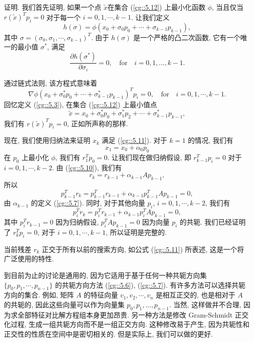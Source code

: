 \documentclass[a4paper]{ctexart}
\begin{document}
{证明. 我们首先证明, 如果一个点 $\tilde{x}$在集合 (\ref{cg::5.12}) 
上最小化函数 $\phi$, 当且仅当 $r(\tilde{x})^T p_i  = 0$ 
对于每一个 $i = 0, 1,\cdots, k - 1$. 
让我们定义 
$$
h(\sigma) =  \phi(x_0 + \sigma_0 p_0 + \cdots + \sigma_{k-1} p_{k-1}),
$$
其中 $\sigma = (\sigma_0, \sigma_1,\cdots,\sigma_{k - 1})^T$. 
由于 $h(\sigma)$ 是一个严格的凸二次函数, 它有一个唯一的最小值 $\sigma^*$, 
满足
\begin{equation*}
\frac{\partial h(\sigma^*)}{\partial \sigma_i} = 0, 
\quad \text{for} \quad i = 0, 1,..., k - 1.
\end{equation*}

通过链式法则, 该方程式意味着
\begin{equation*}
\nabla \phi(x_0 + \sigma_0^* p_0 + \cdots 
+ \sigma_{k-1}^* p_{k-1})^T p_i = 0, \quad \text{for} 
\quad i = 0, 1,\cdots, k - 1.
\end{equation*}
回忆定义 (\ref{cg::5.3}), 在集合 (\ref{cg::5.12}) 上最小值点 
$$
\tilde{x} = x_0 + \sigma_0^* p_0 + \sigma_1^* p_2 
+ \cdots + \sigma_{k-1}^* p_{k-1}, 
$$
我们有 $r(\tilde{x})^T p_i  = 0$, 正如所声称的那样.

现在, 我们使用归纳法来证明 $x_k$ 满足 (\ref{cg::5.11}). 
对于 $k = 1$ 的情况, 我们有
$$
x_1 = x_0 + \alpha_0 p_0
$$ 
在 $p_0$ 上最小化 $\phi$, 我们有 $r_1^T p_0 = 0$. 
让我们现在做归纳假设, 即 $r_{k - 1}^T p_i = 0$ 
对于 $i = 0, 1,\cdots, k - 2$. 
由 (\ref{cg::5.10}), 我们有
\begin{equation*}
r_k = r_{k - 1} + \alpha_{k - 1}A p_{k - 1},
\end{equation*}
所以
\begin{equation*}
p_{k-1}^T r_k = p_{k-1}^T r_{k-1} 
+ \alpha_{k-1} p_{k-1}^T A p_{k-1} = 0,
\end{equation*}
由 $\alpha_{k - 1}$ 的定义 (\ref{cg::5.7}). 
同时, 对于其他向量 $p_i$, $i = 0, 1, \cdots, k - 2$, 我们有
\begin{equation*}
p_i^T r_k = p_i^T r_{k - 1} + \alpha_{k - 1} p_i^T A p_{k - 1} = 0,
\end{equation*}
其中 $p_i^T r_{k - 1} = 0$ 因为归纳假设, $p_i^T A p_{k-1} = 0$ 
因为向量 $p_i$ 的共轭. 我们已经证明了 
$r_k^T p_i = 0$, 对于 $i = 0, 1,\cdots, k - 1$, 所以证明是完整的. 

当前残差 $r_k$ 正交于所有以前的搜索方向, 如公式 (\ref{cg::5.11}) 所表述, 
这是一个将广泛使用的特性. 

到目前为止的讨论是通用的, 因为它适用于基于任何一种共轭方向集 
$\{p_0, p_1,\cdots, p_{n - 1}\}$ 
的共轭方向方法 (\ref{cg::5.6}), (\ref{cg::5.7}). 
有许多方法可以选择共轭方向的集合. 例如, 矩阵 $A$ 的特征向量 
$v_1, v_2,\cdots,v_n$ 是相互正交的, 也是相对于 $A$ 的共轭的, 
因此这些向量可以作为向量集 ${p_0, p_1,..., p_{n - 1}}$. 
当然, 这样做并不合理, 因为求全部特征对比解方程组本身更加昂贵. 
另一种方法是修改 Gram-Schmidt 正交化过程, 
生成一组共轭方向而不是一组正交方向. 这种修改易于产生, 
因为共轭性和正交性的性质在空间中是密切相关的. 
但是实际上, 我们可以做的更好.

}
\end{document}
